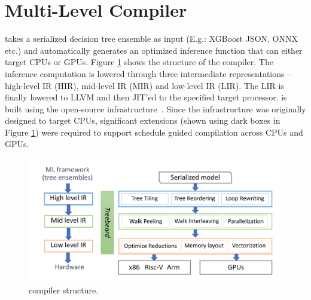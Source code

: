 \section{\Treebeard{} Multi-Level Compiler}


\Treebeard{} takes a serialized decision tree ensemble as input (E.g.:
XGBoost JSON, ONNX etc.) and automatically generates an optimized inference function
that can either target CPUs or GPUs. 
Figure \ref{Fig:CompilerStructure} shows the structure of the \Treebeard{} compiler. 
The inference computation is lowered through three intermediate representations
-- high-level IR (HIR), mid-level IR (MIR) and low-level IR (LIR). The LIR is
finally lowered to LLVM and then JIT'ed to the specified target processor. 
\Treebeard{} is built using the open-source \TreebeardOLD{} infrastructure~\cite{Treebeard}.
Since the \TreebeardOLD{} infrastructure was originally designed to target CPUs,
significant extensions  (shown using dark boxes in Figure \ref{Fig:CompilerStructure})
were required to support schedule guided compilation across CPUs and GPUs. 

\begin{figure}[htb]
  \centering
  \includegraphics[width=\linewidth]{figures/compiler.png}
  \caption{\Treebeard{} compiler structure.}
  \label{Fig:CompilerStructure}
\end{figure}

